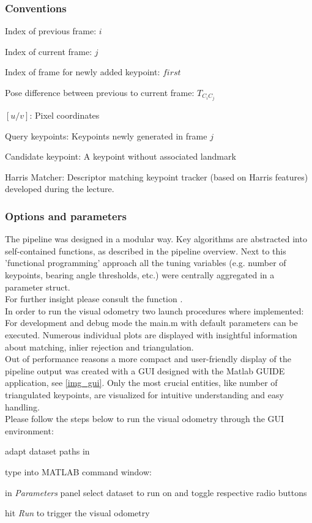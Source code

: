 \subsubsection{Conventions}
\begin{compactitem}
	\item Index of previous frame: $i$
	\item Index of current frame: $j$
	\item Index of frame for newly added keypoint: $first$
	\item Pose difference between previous to current frame: $T_{C_iC_j}$
	\item $\left[u/v\right]$: Pixel coordinates
	\item Query keypoints: Keypoints newly generated in frame $j$ 
	\item Candidate keypoint: A keypoint without associated landmark
	\item Harris Matcher: Descriptor matching keypoint tracker (based on Harris features) developed during the lecture.
\end{compactitem}

\subsubsection{Options and parameters}
The pipeline was designed in a modular way. Key algorithms are abstracted into self-contained functions, as described in the pipeline overview. Next to this 'functional programming' approach all the tuning variables (e.g. number of keypoints, bearing angle thresholds, etc.) were centrally aggregated in a parameter struct.\\
For further insight please consult the function .\\

In order to run the visual odometry two launch procedures where implemented: For development and debug mode the main.m with default parameters can be executed. Numerous individual plots are displayed with insightful information about matching, inlier rejection and triangulation.\\

Out of performance reasons a more compact and user-friendly display of the pipeline output was created with a GUI designed with the Matlab GUIDE application, see \cref{img_gui}. Only the most crucial entities, like number of triangulated keypoints, are visualized for intuitive understanding and easy handling.\\
Please follow the steps below to run the visual odometry through the GUI environment:
\begin{compactenum}
	\item adapt dataset paths in 
	\item type into MATLAB command window: 
	\item in \textit{Parameters} panel select dataset to run on and toggle respective radio buttons
	\item hit \textit{Run} to trigger the visual odometry\\
\end{compactenum}

